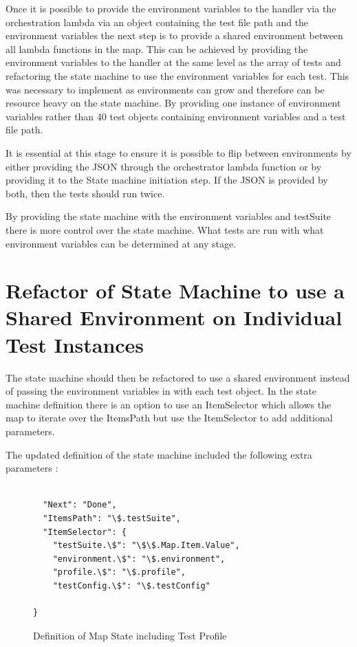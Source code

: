 \documentclass[12pt,a4paper,titlepage]{report}
\begin{document}
Once it is possible to provide the environment variables to the handler via the orchestration lambda via an
object containing the test file path and the environment variables the next step is to provide a shared environment
between all lambda functions in the map. This can be achieved by providing the environment variables to the handler
at the same level as the array of tests and refactoring the state machine to use the environment variables for
each test. This was necessary to implement as environments can grow and therefore can be resource heavy on the
state machine. By providing one instance of environment variables rather than 40 test objects containing
environment variables and a test file path.

It is essential at this stage to ensure it is possible to flip between environments by either providing the JSON through the
orchestrator lambda function or by providing it to the State machine initiation step. If the JSON is provided by both, then the tests should run twice.

By providing the state machine with the environment variables and testSuite there is more control over the state
machine. What tests are run with what environment variables can be determined at any stage.

\section{Refactor of State Machine to use a Shared Environment on Individual Test Instances }

The state machine should then be refactored to use a shared environment instead of
passing the environment variables in with each test object. In the state machine definition there is an option to
use an ItemSelector which allows the map to iterate over the ItemsPath but use the ItemSelector to add additional
parameters.

The updated definition of the state machine included the following extra parameters :

\begin{figure}[H]
  \begin{tcolorbox}
    \begin{verbatim}

  "Next": "Done",
  "ItemsPath": "\$.testSuite",
  "ItemSelector": {
    "testSuite.\$": "\$\$.Map.Item.Value",
    "environment.\$": "\$.environment",
    "profile.\$": "\$.profile",
    "testConfig.\$": "\$.testConfig"

}
\end{verbatim}
  \end{tcolorbox}
  \caption{Definition of Map State including Test Profile}
\end{figure}
\end{document}
